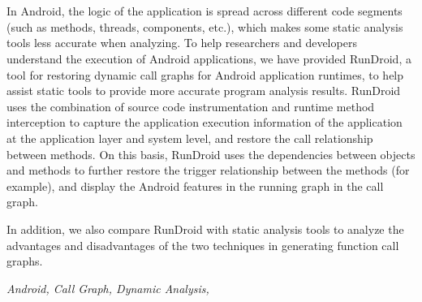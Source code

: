 \newpage
\vspace{-1cm}
\chapter*{}
\vspace{-0.5cm}

In Android, the logic of the application is spread across different code segments (such as methods, threads, components, etc.), which makes some static analysis tools less accurate when analyzing.
To help researchers and developers understand the execution of Android applications, we have provided RunDroid, a tool for restoring dynamic call graphs for Android application runtimes, to help assist static tools to provide more accurate program analysis results.
RunDroid uses the combination of source code instrumentation and runtime method interception to capture the application execution information of the application at the application layer and system level, and restore the call relationship between methods.
On this basis, RunDroid uses the dependencies between objects and methods to further restore the trigger relationship between the methods (for example), and display the Android features in the running graph in the call graph.

In addition, we also compare RunDroid with static analysis tools to analyze the advantages and disadvantages of the two techniques in generating function call graphs.



{} \textit{Android, Call Graph, Dynamic Analysis, }


































